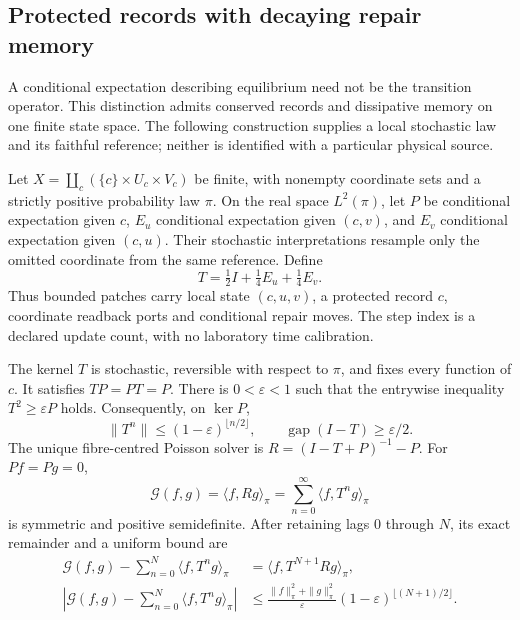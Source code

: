\subsection{Protected records with decaying repair memory}
\label{sec:protected-record-memory}

A conditional expectation describing equilibrium need not be the transition
operator. This distinction admits conserved records and dissipative memory
on one finite state space. The following construction supplies a local
stochastic law and its faithful reference; neither is identified with a
particular physical source.

Let $X=\coprod_c(\{c\}\times U_c\times V_c)$ be finite, with nonempty
coordinate sets and a strictly positive probability law $\pi$.
On the real space $L^2(\pi)$, let $P$ be conditional expectation given $c$,
$E_u$ conditional expectation given $(c,v)$, and $E_v$ conditional
expectation given $(c,u)$. Their stochastic interpretations resample only
the omitted coordinate from the same reference. Define
\begin{equation}
 T=\tfrac12 I+\tfrac14E_u+\tfrac14E_v.
 \label{eq:protected-memory-lazy-law}
\end{equation}
Thus bounded patches carry local state $(c,u,v)$, a protected record $c$,
coordinate readback ports and conditional repair moves. The step index is
a declared update count, with no laboratory time calibration.

\begin{proposition}
\label{prop:protected-record-memory}
The kernel $T$ is stochastic, reversible with respect to $\pi$, and fixes
every function of $c$. It satisfies $TP=PT=P$. There is
$0<\varepsilon<1$ such that the entrywise inequality
$T^2\ge\varepsilon P$ holds. Consequently, on $\ker P$,
\begin{equation}
 \|T^n\|\le(1-\varepsilon)^{\lfloor n/2\rfloor},\qquad
 \operatorname{gap}(I-T)\ge\varepsilon/2.
 \label{eq:protected-memory-decay}
\end{equation}
The unique fibre-centred Poisson solver is
$R=(I-T+P)^{-1}-P$. For $Pf=Pg=0$,
\begin{equation}
 \mathcal G(f,g)=\langle f,Rg\rangle_\pi
   =\sum_{n=0}^{\infty}\langle f,T^ng\rangle_\pi
 \label{eq:protected-memory-green-kubo}
\end{equation}
is symmetric and positive semidefinite. After retaining lags $0$ through
$N$, its exact remainder and a uniform bound are
\begin{equation}
 \begin{split}
 \mathcal G(f,g)-\sum_{n=0}^{N}\langle f,T^ng\rangle_\pi
   &=\langle f,T^{N+1}Rg\rangle_\pi,\\
 \left|\mathcal G(f,g)-\sum_{n=0}^{N}\langle f,T^ng\rangle_\pi\right|
   &\le\frac{\|f\|_\pi^2+\|g\|_\pi^2}{\varepsilon}
      (1-\varepsilon)^{\lfloor(N+1)/2\rfloor}.
 \end{split}
 \label{eq:protected-memory-tail}
\end{equation}
\end{proposition}

